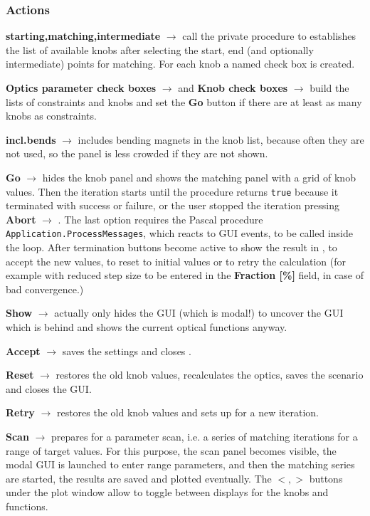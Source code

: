 \documentclass[12pt]{article}
\newcommand\code[1]{{\tt #1}}
\newcommand{\ofld}[1]{\colorbox{black!15}{{{\color{black}\bf #1}}}}
\newcommand\guico[1]{{\color{blue}\code{#1}}}
\newcommand{\evcod}[2]{\ofld{#1} $\rightarrow$ \guico{#2}}
\newcommand{\opagui}[1]{\colorbox{blue!20}{{\color{black}\code{#1}}}}
\newcommand{\ogui}[1]{\hyperref[#1]{\opagui{#1}}}
\newcommand{\act}[1]{\subsubsection*{Actions} #1}
\begin{document}
\act{
\evcod{starting,matching,intermediate}{(ini,mat,mid)pointChange} call the private procedure \guico{knoblist} to establishes the list of available knobs after selecting the start, end (and optionally intermediate) points for matching. For each knob a named check box is created.

\evcod{Optics parameter check boxes}{cselClick} and \evcod{Knob check boxes}{knobSelect} build the lists of constraints and knobs and set the \ofld{Go} button if there are at least as many knobs as constraints.

\evcod{incl.bends}{cbxIncBendsClick} includes bending magnets in the knob list, because often they are not used, so the panel is less crowded if they are not shown.

\evcod{Go}{gobutClick} hides the knob panel\guico{panknobs} and shows the matching panel \guico{panmat} with a grid of knob values. Then the iteration starts until the procedure \guico{Step} returns \code{true} because it terminated with success or failure, or the user stopped the iteration pressing \evcod{Abort}{bustopClick}. The last option requires the Pascal procedure \code{Application.ProcessMessages}, which reacts to GUI events, to be called inside the loop. After termination buttons become active to show the result in \ogui{opalinop}, to accept the new values, to reset to initial values or to retry the calculation (for example with reduced step size to be entered in the \ofld{Fraction [\%]} field, in case of bad convergence.)

\evcod{Show}{butShowClick} actually only hides the \ogui{omatching} GUI (which is modal!) to  uncover the \ogui{opalinop} GUI which is behind and shows the current optical functions anyway.

\evcod{Accept}{butaccClick} saves the settings and closes \ogui{omatching}.

\evcod{Reset}{butaccresClick} restores the old knob values, recalculates the optics, saves the scenario and closes the GUI.

\evcod{Retry}{butrtyClick} restores the old knob values and sets up for a new iteration.

\evcod{Scan}{ScanClick} prepares for a parameter scan, i.e. a series of matching iterations for a range of target values. For this purpose, the scan panel \guico{panfig} becomes visible, the modal GUI \ogui{omatchscan} is launched to enter range parameters, and then the matching series are started, the results are saved and plotted eventually. The \ofld{$<,>$} buttons under the plot window allow to toggle between displays for the knobs and functions.
}
\end{document}

